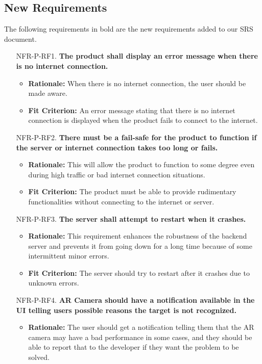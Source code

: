 \documentclass{article}
\begin{document}
\subsection{New Requirements}
The following requirements in bold are the new requirements added to our SRS document.
\begin{itemize}
	\item[NFR-P-RF1.] \textbf{The product shall display an error message when there is no internet connection.}
    \begin{itemize}
        \item \textbf{Rationale:} When there is no internet connection, the user should be made aware.
        \item \textbf{Fit Criterion:} An error message stating that there is no internet connection is displayed when the product fails to connect to the internet.
    \end{itemize}
	\item[NFR-P-RF2.] \textbf{There must be a fail-safe for the product to function if the server or internet connection takes too long or fails.}
    \begin{itemize}
        \item \textbf{Rationale:} This will allow the product to function to some degree even during high traffic or bad internet connection situations.
        \item \textbf{Fit Criterion:} The product must be able to provide rudimentary functionalities without connecting to the internet or server.
    \end{itemize}
	\item[NFR-P-RF3.] \textbf{The server shall attempt to restart when it crashes.}
    \begin{itemize}
        \item \textbf{Rationale:} This requirement enhances the robustness of the backend server and prevents it from going down for a long time because of some intermittent minor errors.
        \item \textbf{Fit Criterion:} The server should try to restart after it crashes due to unknown errors.
    \end{itemize}
	\item[NFR-P-RF4.] \textbf{AR Camera should have a notification available in the UI telling users possible reasons the target is not recognized.}
    \begin{itemize}
        \item \textbf{Rationale:} The user should get a notification telling them that the AR camera may have a bad performance in some cases, and they should be able to report that to the developer if they want the problem to be solved.

\end{itemize}
\end{itemize}
\end{document}
